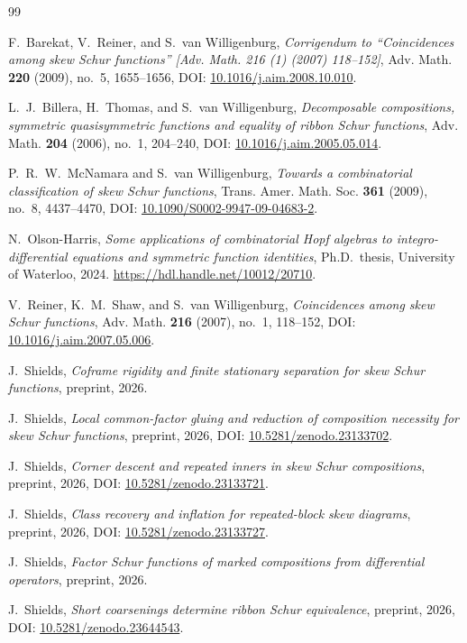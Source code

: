 \documentclass[11pt,a4paper]{amsart}
\numberwithin{equation}{section}
\theoremstyle{plain}
\theoremstyle{definition}
\begin{document}
\begin{thebibliography}{99}

F.~Barekat, V.~Reiner, and S.~van Willigenburg,
\emph{Corrigendum to ``Coincidences among skew Schur functions'' [Adv. Math. 216 (1) (2007) 118--152]},
Adv. Math. \textbf{220} (2009), no.~5, 1655--1656,
DOI: \href{https://doi.org/10.1016/j.aim.2008.10.010}{10.1016/\allowbreak j.aim.2008.10.010}.

L.~J.~Billera, H.~Thomas, and S.~van Willigenburg,
\emph{Decomposable compositions, symmetric quasisymmetric functions and equality of ribbon Schur functions},
Adv. Math. \textbf{204} (2006), no.~1, 204--240,
DOI: \href{https://doi.org/10.1016/j.aim.2005.05.014}{10.1016/\allowbreak j.aim.2005.05.014}.

P.~R.~W.~McNamara and S.~van Willigenburg,
\emph{Towards a combinatorial classification of skew Schur functions},
Trans. Amer. Math. Soc. \textbf{361} (2009), no.~8, 4437--4470,
DOI: \href{https://doi.org/10.1090/S0002-9947-09-04683-2}{10.1090/\allowbreak S0002-9947-09-04683-2}.

N.~Olson-Harris,
\emph{Some applications of combinatorial Hopf algebras to integro-differential equations and symmetric function identities},
Ph.D.\ thesis, University of Waterloo, 2024.
\url{https://hdl.handle.net/10012/20710}.

V.~Reiner, K.~M.~Shaw, and S.~van Willigenburg,
\emph{Coincidences among skew Schur functions},
Adv. Math. \textbf{216} (2007), no.~1, 118--152,
DOI: \href{https://doi.org/10.1016/j.aim.2007.05.006}{10.1016/\allowbreak j.aim.2007.05.006}.

J.~Shields,
\emph{Coframe rigidity and finite stationary separation for skew Schur functions},
preprint, 2026.

J.~Shields,
\emph{Local common-factor gluing and reduction of composition necessity for skew Schur functions},
preprint, 2026,
DOI: \href{https://doi.org/10.5281/zenodo.23133702}{10.5281/\allowbreak zenodo.23133702}.

J.~Shields,
\emph{Corner descent and repeated inners in skew Schur compositions},
preprint, 2026,
DOI: \href{https://doi.org/10.5281/zenodo.23133721}{10.5281/\allowbreak zenodo.23133721}.

J.~Shields,
\emph{Class recovery and inflation for repeated-block skew diagrams},
preprint, 2026,
DOI: \href{https://doi.org/10.5281/zenodo.23133727}{10.5281/\allowbreak zenodo.23133727}.

J.~Shields,
\emph{Factor Schur functions of marked compositions from differential operators},
preprint, 2026.

J.~Shields,
\emph{Short coarsenings determine ribbon Schur equivalence},
preprint, 2026,
DOI: \href{https://doi.org/10.5281/zenodo.23644543}{10.5281/\allowbreak zenodo.23644543}.

\end{thebibliography}
\end{document}
